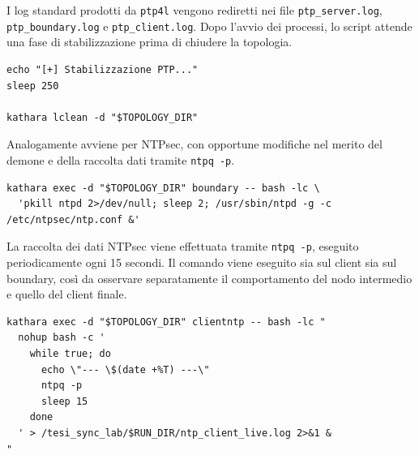 \begin{sloppypar}
  I log standard prodotti da \texttt{ptp4l} vengono rediretti nei file \texttt{ptp\_server.log},
  \texttt{ptp\_boundary.log} e \texttt{ptp\_client.log}. Dopo l'avvio dei processi,
  lo script attende una fase di stabilizzazione prima di chiudere la topologia.
\end{sloppypar}

\begin{listing}[H]
\begin{verbatim}
echo "[+] Stabilizzazione PTP..."
sleep 250

kathara lclean -d "$TOPOLOGY_DIR"
\end{verbatim}
\caption{Fase di stabilizzazione PTP e chiusura della run.}
\label{lst:auto-ptp-sleep}
\end{listing}

Analogamente avviene per NTPsec, con opportune modifiche nel merito del demone e
della raccolta dati tramite \texttt{ntpq -p}.

\begin{listing}[H]
\begin{verbatim}
kathara exec -d "$TOPOLOGY_DIR" boundary -- bash -lc \
  'pkill ntpd 2>/dev/null; sleep 2; /usr/sbin/ntpd -g -c /etc/ntpsec/ntp.conf &'
\end{verbatim}
\caption{Avvio controllato di NTPsec sul boundary.}
\label{lst:auto-ntpsec-start}
\end{listing}

La raccolta dei dati NTPsec viene effettuata tramite \texttt{ntpq -p}, eseguito
periodicamente ogni 15 secondi. Il comando viene eseguito sia sul client sia sul boundary,
così da osservare separatamente il comportamento del nodo intermedio e quello
del client finale.

\begin{listing}[H]
\begin{verbatim}
kathara exec -d "$TOPOLOGY_DIR" clientntp -- bash -lc "
  nohup bash -c '
    while true; do
      echo \"--- \$(date +%T) ---\"
      ntpq -p
      sleep 15
    done
  ' > /tesi_sync_lab/$RUN_DIR/ntp_client_live.log 2>&1 &
"
\end{verbatim}
\caption{Loop di logging NTPsec sul client.}
\label{lst:auto-ntpsec-client-loop}
\end{listing}

